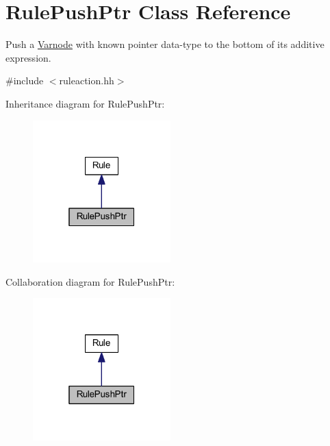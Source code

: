 \hypertarget{class_rule_push_ptr}{}\section{Rule\+Push\+Ptr Class Reference}
\label{class_rule_push_ptr}


Push a \mbox{\hyperlink{class_varnode}{Varnode}} with known pointer data-\/type to the bottom of its additive expression.  




{\ttfamily \#include $<$ruleaction.\+hh$>$}



Inheritance diagram for Rule\+Push\+Ptr\+:
\nopagebreak
\begin{figure}[H]
\begin{center}
\leavevmode
\includegraphics[width=151pt]{class_rule_push_ptr__inherit__graph}
\end{center}
\end{figure}


Collaboration diagram for Rule\+Push\+Ptr\+:
\nopagebreak
\begin{figure}[H]
\begin{center}
\leavevmode
\includegraphics[width=151pt]{class_rule_push_ptr__coll__graph}
\end{center}
\end{figure}
